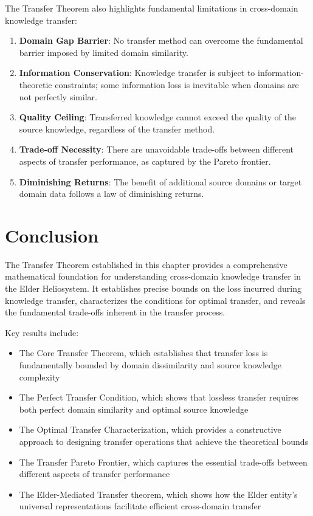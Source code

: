 The Transfer Theorem also highlights fundamental limitations in cross-domain knowledge transfer:

\begin{enumerate}
    \item \textbf{Domain Gap Barrier}: No transfer method can overcome the fundamental barrier imposed by limited domain similarity.
    
    \item \textbf{Information Conservation}: Knowledge transfer is subject to information-theoretic constraints; some information loss is inevitable when domains are not perfectly similar.
    
    \item \textbf{Quality Ceiling}: Transferred knowledge cannot exceed the quality of the source knowledge, regardless of the transfer method.
    
    \item \textbf{Trade-off Necessity}: There are unavoidable trade-offs between different aspects of transfer performance, as captured by the Pareto frontier.
    
    \item \textbf{Diminishing Returns}: The benefit of additional source domains or target domain data follows a law of diminishing returns.
\end{enumerate}

\section{Conclusion}

The Transfer Theorem established in this chapter provides a comprehensive mathematical foundation for understanding cross-domain knowledge transfer in the Elder Heliosystem. It establishes precise bounds on the loss incurred during knowledge transfer, characterizes the conditions for optimal transfer, and reveals the fundamental trade-offs inherent in the transfer process.

Key results include:
\begin{itemize}
    \item The Core Transfer Theorem, which establishes that transfer loss is fundamentally bounded by domain dissimilarity and source knowledge complexity
    \item The Perfect Transfer Condition, which shows that lossless transfer requires both perfect domain similarity and optimal source knowledge
    \item The Optimal Transfer Characterization, which provides a constructive approach to designing transfer operations that achieve the theoretical bounds
    \item The Transfer Pareto Frontier, which captures the essential trade-offs between different aspects of transfer performance
    \item The Elder-Mediated Transfer theorem, which shows how the Elder entity's universal representations facilitate efficient cross-domain transfer
\end{itemize}

